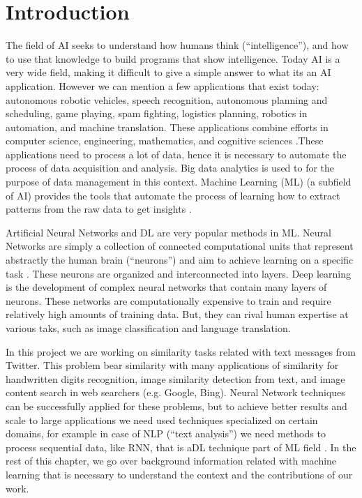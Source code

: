 \documentclass[12pt]{report}
\begin{document}
	\section{Introduction}
	
	The field of \ac{AI} seeks to understand how humans think (``intelligence''), and how to use that knowledge to build programs that show intelligence. 
	Today \ac{AI} is a very wide field, making it difficult to give a simple answer to what its an AI application. However we can mention a few applications that exist today:  autonomous robotic vehicles, speech recognition, autonomous planning and scheduling, game playing, spam fighting, logistics planning, robotics in 
	automation, and machine translation. These applications combine efforts in computer science, engineering, mathematics, and cognitive sciences \cite{Russell2010}.These applications need to process a lot of data, hence it is necessary to automate the process of data acquisition and analysis. 
	Big data analytics is used to for the purpose of data management in this context.  Machine Learning (\ac{ML})  (a subfield of \ac{AI}) provides the tools  that automate the process of learning  how to extract patterns from the raw data to get insights \cite{Kelleher2015}.
	
	Artificial Neural Networks and \ac{DL} are very popular methods in \ac{ML}. Neural Networks are simply a collection of connected computational 
	units that represent abstractly the human brain (“neurons”) and  aim to achieve learning on a specific task \cite{Russell2010}. These neurons are organized and interconnected into layers. Deep learning is the development of complex neural networks that contain many layers of neurons. These networks are computationally expensive to train and require relatively high amounts of training data. But, they can rival human expertise at various taks, such as image classification and language translation.  
	
	In this project we are working on similarity tasks related with text messages from Twitter. This problem bear similarity with many applications of similarity for handwritten digits recognition, image similarity detection from text, and image content search  in  web searchers (e.g. Google, Bing).  Neural Network techniques can be successfully applied for these problems, but to achieve better results and scale to large applications we need used techniques specialized on certain domains, for example in case of \ac{NLP} (``text analysis'') we need methods to process sequential data, like {RNN}, that is a{DL} technique part of {ML} field \cite{Goodfellow2016}.  In the rest of this chapter, we go over background information related with machine learning that is necessary to understand the context and the contributions of our work.
	
\end{document}
